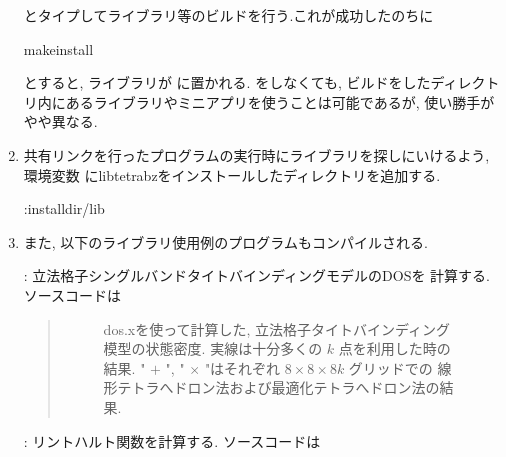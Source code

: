 \documentclass[letterpaper,10pt,dvipdfmx,openany]{sphinxmanual}
\begin{document}
\begin{enumerate}
\sphinxAtStartPar
とタイプしてライブラリ等のビルドを行う.これが成功したのちに

\begin{sphinxVerbatim}[commandchars=\\\{\}]
\PYGZdl{}makeinstall
\end{sphinxVerbatim}

\sphinxAtStartPar
とすると, ライブラリが  に置かれる.
 をしなくても, ビルドをしたディレクトリ内にあるライブラリやミニアプリを使うことは可能であるが, 使い勝手がやや異なる.

\item {} 
\sphinxAtStartPar
共有リンクを行ったプログラムの実行時にライブラリを探しにいけるよう,
環境変数  にlibtetrabzをインストールしたディレクトリを追加する.

\begin{sphinxVerbatim}[commandchars=\\\{\}]
\PYGZdl{}:install\PYGZus{}dir/lib
\end{sphinxVerbatim}

\item {} 
\sphinxAtStartPar
また,
 以下のライブラリ使用例のプログラムもコンパイルされる.

\sphinxAtStartPar
{} :
立法格子シングルバンドタイトバインディングモデルのDOSを 計算する.
ソースコードは 
\begin{quote}

\begin{figure}[htbp]
\centering
\capstart

\noindent{}
\caption{dos.xを使って計算した,
立法格子タイトバインディング模型の状態密度.
実線は十分多くの \(k\) 点を利用した時の結果.
" \(+\) ",
" \(\times\) "はそれぞれ
\(8\times8\times8 k\) グリッドでの
線形テトラへドロン法および最適化テトラへドロン法の結果.}\label{\detokenize{install:id5}}\end{figure}
\end{quote}

\sphinxAtStartPar
{} : リントハルト関数を計算する.
ソースコードは 
\begin{quote}


\end{quote}
\end{enumerate}
\end{document}
